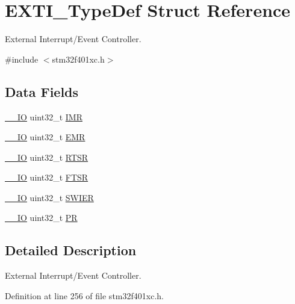 \hypertarget{struct_e_x_t_i___type_def}{}\section{E\+X\+T\+I\+\_\+\+Type\+Def Struct Reference}
\label{struct_e_x_t_i___type_def}


External Interrupt/\+Event Controller.  




{\ttfamily \#include $<$stm32f401xc.\+h$>$}

\subsection*{Data Fields}
\begin{DoxyCompactItemize}
\item 
\hyperlink{core__sc300_8h_aec43007d9998a0a0e01faede4133d6be}{\+\_\+\+\_\+\+IO} uint32\+\_\+t \hyperlink{struct_e_x_t_i___type_def_ae845b86e973b4bf8a33c447c261633f6}{I\+MR}
\item 
\hyperlink{core__sc300_8h_aec43007d9998a0a0e01faede4133d6be}{\+\_\+\+\_\+\+IO} uint32\+\_\+t \hyperlink{struct_e_x_t_i___type_def_a6034c7458d8e6030f6dacecf0f1a3a89}{E\+MR}
\item 
\hyperlink{core__sc300_8h_aec43007d9998a0a0e01faede4133d6be}{\+\_\+\+\_\+\+IO} uint32\+\_\+t \hyperlink{struct_e_x_t_i___type_def_a0d952a17455687d6e9053730d028fa1d}{R\+T\+SR}
\item 
\hyperlink{core__sc300_8h_aec43007d9998a0a0e01faede4133d6be}{\+\_\+\+\_\+\+IO} uint32\+\_\+t \hyperlink{struct_e_x_t_i___type_def_aa0f7c828c46ae6f6bc9f66f11720bbe6}{F\+T\+SR}
\item 
\hyperlink{core__sc300_8h_aec43007d9998a0a0e01faede4133d6be}{\+\_\+\+\_\+\+IO} uint32\+\_\+t \hyperlink{struct_e_x_t_i___type_def_a9eae93b6cc13d4d25e12f2224e2369c9}{S\+W\+I\+ER}
\item 
\hyperlink{core__sc300_8h_aec43007d9998a0a0e01faede4133d6be}{\+\_\+\+\_\+\+IO} uint32\+\_\+t \hyperlink{struct_e_x_t_i___type_def_af8d25514079514d38c104402f46470af}{PR}
\end{DoxyCompactItemize}


\subsection{Detailed Description}
External Interrupt/\+Event Controller. 

Definition at line 256 of file stm32f401xc.\+h.



